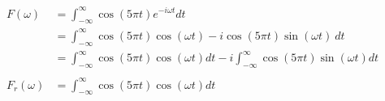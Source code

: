 \documentclass[preview]{standalone}
\begin{document}
\begin{align*}
F(\omega)&= \int_{-\infty}^{\infty} \cos{(5\pi t)}e^{-i\omega t} dt \\ &= \int_{-\infty}^{\infty} \cos{(5\pi t)}\cos{(\omega t)}-i\cos{(5\pi t)}\sin{(\omega t)} \ dt \\ &=\int_{-\infty}^{\infty} \cos{(5\pi t)}\cos{(\omega t)} dt - i\int_{-\infty}^{\infty} \cos{(5\pi t)}\sin{(\omega t)} dt \\ \\ F_{r}(\omega)&=\int_{-\infty}^{\infty} \cos{(5\pi t)}\cos{(\omega t)} dt
\end{align*}
\end{document}
